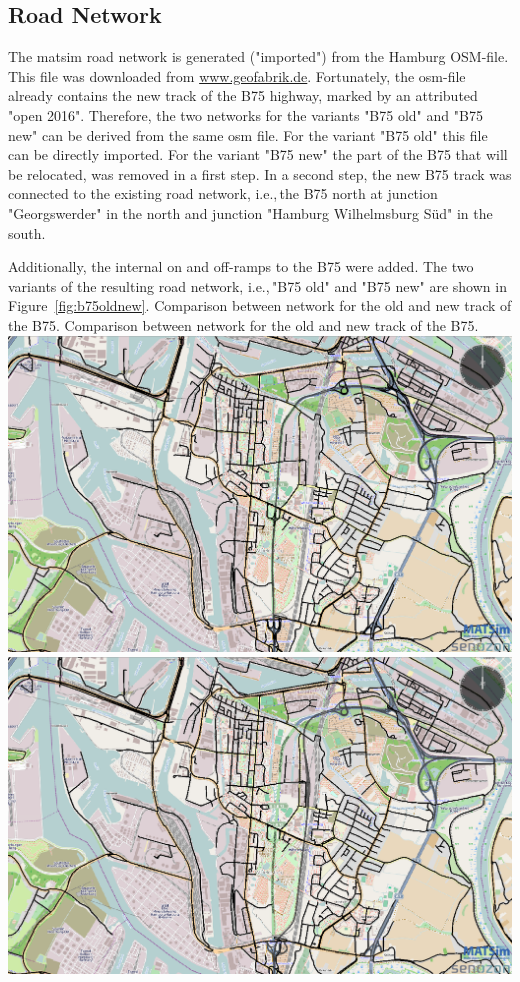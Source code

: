 \subsection{Road Network}
The \gls{matsim} road network is generated ("imported") from the Hamburg OSM-file. This file was downloaded from \url{www.geofabrik.de}. Fortunately, the osm-file already contains the new track of the B75 highway, marked by an attributed "open 2016". Therefore, the two networks for the variants "B75 old" and "B75 new" can be derived from the same \gls{osm} file. For the variant "B75 old" this file can be directly imported. For the variant "B75 new" the part of the B75 that will be relocated, was removed in a first step. In a second step, the new B75 track was connected to the existing road network, i.e.,\,the B75 north at junction "Georgswerder" in the north and junction "Hamburg Wilhelmsburg Süd" in the south.

Additionally, the internal on and off-ramps to the B75 were added. The two variants of the resulting road network, i.e.,\,"B75 old" and "B75 new" are shown in Figure~\ref{fig:b75oldnew}.
%
\createfigure%
{Comparison between network for the old and new track of the B75.}%
{Comparison between network for the old and new track of the B75.}%
{\label{fig:b75oldnew}}%
{%
  \createsubfigure%
  {}%
  {\includegraphics[width=.475\linewidth]{using/figures/B75old}}%
  {}%
  {}%
  \createsubfigure%
  {}%
  {\includegraphics[width=.475\linewidth]{using/figures/B75new}}
  {}%
  {}%
}%
  {}%


